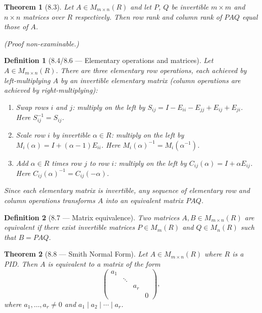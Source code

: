 \documentclass[12pt]{article}
\newtheorem{theorem}{Theorem}
\newtheorem{definition}{Definition}
\begin{document}
\begin{theorem}[8.3]
Let $A \in M_{m \times n}(R)$ and let $P$, $Q$ be invertible $m \times m$ and $n \times n$ matrices over $R$ respectively. Then row rank and column rank of $PAQ$ equal those of $A$.
\end{theorem}

\noindent\textit{(Proof non-examinable.)}

\begin{definition}[8.4/8.6 — Elementary operations and matrices]
Let $A \in M_{m \times n}(R)$. There are three \emph{elementary row operations}, each achieved by left-multiplying $A$ by an invertible \emph{elementary matrix} (column operations are achieved by right-multiplying):
\begin{enumerate}[label=(\roman*)]
  \item \textit{Swap} rows $i$ and $j$: multiply on the left by $S_{ij} = I - E_{ii} - E_{jj} + E_{ij} + E_{ji}$. Here $S_{ij}^{-1} = S_{ij}$.
  \item \textit{Scale} row $i$ by invertible $\alpha \in R$: multiply on the left by $M_i(\alpha) = I + (\alpha-1)E_{ii}$. Here $M_i(\alpha)^{-1} = M_i(\alpha^{-1})$.
  \item \textit{Add} $\alpha \in R$ times row $j$ to row $i$: multiply on the left by $C_{ij}(\alpha) = I + \alpha E_{ij}$. Here $C_{ij}(\alpha)^{-1} = C_{ij}(-\alpha)$.
\end{enumerate}
Since each elementary matrix is invertible, any sequence of elementary row and column operations transforms $A$ into an equivalent matrix $PAQ$.
\end{definition}

\begin{definition}[8.7 — Matrix equivalence]
Two matrices $A, B \in M_{m \times n}(R)$ are \emph{equivalent} if there exist invertible matrices $P \in M_m(R)$ and $Q \in M_n(R)$ such that $B = PAQ$.
\end{definition}

\begin{theorem}[8.8 — Smith Normal Form]
Let $A \in M_{m \times n}(R)$ where $R$ is a PID. Then $A$ is equivalent to a matrix of the form
\[
  \begin{pmatrix} a_1 & & & \\ & \ddots & & \\ & & a_r & \\ & & & 0 \end{pmatrix},
\]
where $a_1, \ldots, a_r \neq 0$ and $a_1 \mid a_2 \mid \cdots \mid a_r$.
\end{theorem}
\end{document}
